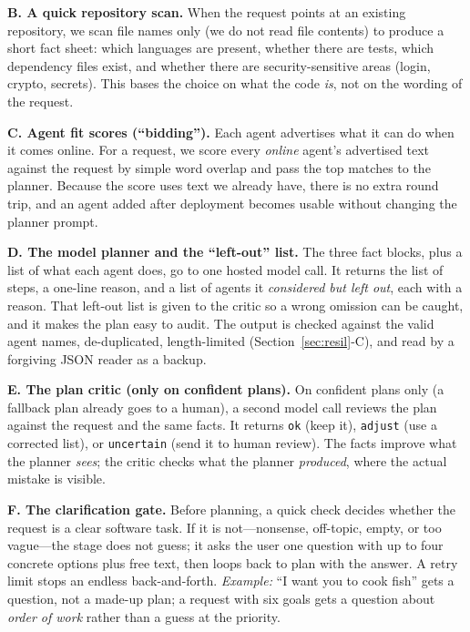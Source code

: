 \documentclass[conference]{IEEEtran}
\begin{document}
\textbf{B. A quick repository scan.} When the request points at an existing
repository, we scan file names only (we do not read file contents) to produce a
short fact sheet: which languages are present, whether there are tests, which
dependency files exist, and whether there are security-sensitive areas (login,
crypto, secrets). This bases the choice on what the code \emph{is}, not on the
wording of the request.

\textbf{C. Agent fit scores (``bidding'').} Each agent advertises what it can do
when it comes online. For a request, we score every \emph{online} agent's
advertised text against the request by simple word overlap and pass the top matches
to the planner. Because the score uses text we already have, there is no extra round
trip, and an agent added after deployment becomes usable without changing the
planner prompt.

\textbf{D. The model planner and the ``left-out'' list.} The three fact blocks, plus
a list of what each agent does, go to one hosted model call. It returns the list of
steps, a one-line reason, and a list of agents it \emph{considered but left out},
each with a reason. That left-out list is given to the critic so a wrong omission
can be caught, and it makes the plan easy to audit. The output is checked against
the valid agent names, de-duplicated, length-limited (Section~\ref{sec:resil}-C), and read
by a forgiving JSON reader as a backup.

\textbf{E. The plan critic (only on confident plans).} On confident plans only (a
fallback plan already goes to a human), a second model call reviews the plan against
the request and the same facts. It returns \texttt{ok} (keep it), \texttt{adjust}
(use a corrected list), or \texttt{uncertain} (send it to human review). The facts
improve what the planner \emph{sees}; the critic checks what the planner
\emph{produced}, where the actual mistake is visible.

\textbf{F. The clarification gate.} Before planning, a quick check decides whether
the request is a clear software task. If it is not---nonsense, off-topic, empty, or
too vague---the stage does not guess; it asks the user one question with up to four
concrete options plus free text, then loops back to plan with the answer. A retry
limit stops an endless back-and-forth. \emph{Example:} ``I want you to cook fish''
gets a question, not a made-up plan; a request with six goals gets a question about
\emph{order of work} rather than a guess at the priority.
\end{document}
